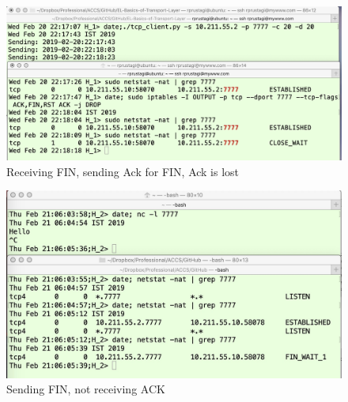 \begin{figure}[!htb]
\centering
\includegraphics[scale=.395]{src/Figures/chap3/8.jpg}
\caption{Receiving FIN, sending Ack for FIN, Ack is lost}\label{chap3-fig8}
\end{figure}

\begin{figure}[!htb]
\centering
\includegraphics[scale=.228]{src/Figures/chap3/9.jpg}
\caption{Sending FIN, not receiving ACK}\label{chap3-fig9}
\end{figure}

